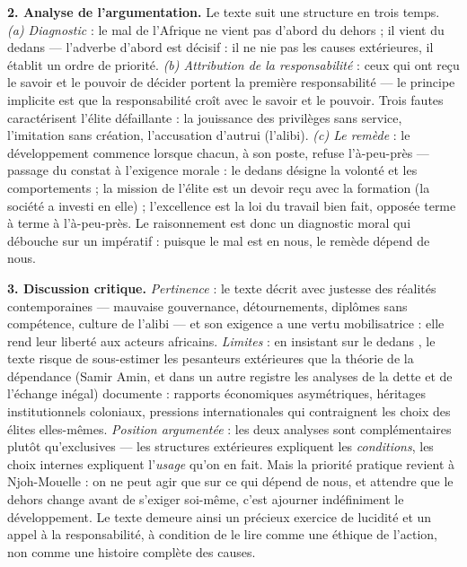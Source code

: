 \documentclass[11pt]{article}
\begin{document}
\begin{corrige}
\textbf{2. Analyse de l'argumentation.} Le texte suit une structure en trois temps. \emph{(a) Diagnostic} : \guillemotleft le mal de l'Afrique ne vient pas d'abord du dehors ; il vient du dedans \guillemotright — l'adverbe \guillemotleft d'abord \guillemotright est décisif : il ne nie pas les causes extérieures, il établit un ordre de priorité. \emph{(b) Attribution de la responsabilité} : ceux qui \guillemotleft ont reçu le savoir \guillemotright et \guillemotleft le pouvoir de décider \guillemotright portent la \guillemotleft première responsabilité \guillemotright — le principe implicite est que la responsabilité croît avec le savoir et le pouvoir. Trois fautes caractérisent l'élite défaillante : la jouissance des privilèges sans service, l'imitation sans création, l'accusation d'autrui (l'alibi). \emph{(c) Le remède} : \guillemotleft le développement commence lorsque chacun, à son poste, refuse l'à-peu-près \guillemotright — passage du constat à l'exigence morale : le \guillemotleft dedans \guillemotright désigne la volonté et les comportements ; la \guillemotleft mission \guillemotright de l'élite est un devoir reçu avec la formation (la société a investi en elle) ; l'\guillemotleft excellence \guillemotright est la loi du travail bien fait, opposée terme à terme à l'à-peu-près. Le raisonnement est donc un diagnostic moral qui débouche sur un impératif : puisque le mal est en nous, le remède dépend de nous.

\textbf{3. Discussion critique.} \emph{Pertinence} : le texte décrit avec justesse des réalités contemporaines — mauvaise gouvernance, détournements, diplômes sans compétence, culture de l'alibi — et son exigence a une vertu mobilisatrice : elle rend leur liberté aux acteurs africains. \emph{Limites} : en insistant sur le \guillemotleft dedans \guillemotright, le texte risque de sous-estimer les pesanteurs extérieures que la théorie de la dépendance (Samir Amin, et dans un autre registre les analyses de la dette et de l'échange inégal) documente : rapports économiques asymétriques, héritages institutionnels coloniaux, pressions internationales qui contraignent les choix des élites elles-mêmes. \emph{Position argumentée} : les deux analyses sont complémentaires plutôt qu'exclusives — les structures extérieures expliquent les \emph{conditions}, les choix internes expliquent l'\emph{usage} qu'on en fait. Mais la priorité pratique revient à Njoh-Mouelle : on ne peut agir que sur ce qui dépend de nous, et attendre que le dehors change avant de s'exiger soi-même, c'est ajourner indéfiniment le développement. Le texte demeure ainsi un précieux exercice de lucidité et un appel à la responsabilité, à condition de le lire comme une éthique de l'action, non comme une histoire complète des causes.
\end{corrige}
\end{document}
